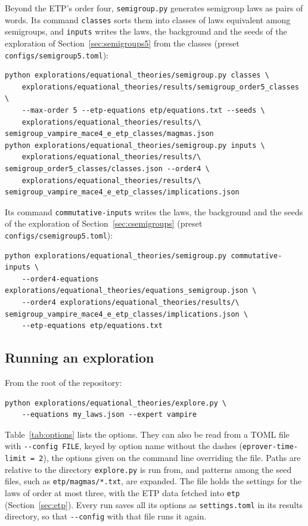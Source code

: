 \documentclass[11pt,a4paper]{article}
\theoremstyle{definition}
\theoremstyle{remark}
\newcommand{\code}[1]{\texttt{#1}}
\begin{document}
Beyond the ETP's order four, \code{semigroup.py} generates semigroup laws as pairs of words. Its command \code{classes} sorts them into classes of laws equivalent among semigroups, and \code{inputs} writes the laws, the background and the seeds of the exploration of Section~\ref{sec:semigroups5} from the classes (preset \code{configs/semigroup5.toml}):
\begin{Verbatim}
python explorations/equational_theories/semigroup.py classes \
    explorations/equational_theories/results/semigroup_order5_classes \
    --max-order 5 --etp-equations etp/equations.txt --seeds \
    explorations/equational_theories/results/\
semigroup_vampire_mace4_e_etp_classes/magmas.json
python explorations/equational_theories/semigroup.py inputs \
    explorations/equational_theories/results/\
semigroup_order5_classes/classes.json --order4 \
    explorations/equational_theories/results/\
semigroup_vampire_mace4_e_etp_classes/implications.json
\end{Verbatim}
Its command \code{commutative-inputs} writes the laws, the background and the seeds of the exploration of Section~\ref{sec:csemigroups} (preset \code{configs/csemigroup5.toml}):
\begin{Verbatim}
python explorations/equational_theories/semigroup.py commutative-inputs \
    --order4-equations explorations/equational_theories/equations_semigroup.json \
    --order4 explorations/equational_theories/results/\
semigroup_vampire_mace4_e_etp_classes/implications.json \
    --etp-equations etp/equations.txt
\end{Verbatim}

\subsection{Running an exploration}

From the root of the repository:
\begin{Verbatim}
python explorations/equational_theories/explore.py \
    --equations my_laws.json --expert vampire
\end{Verbatim}
Table~\ref{tab:options} lists the options. They can also be read from a TOML file with \code{-{}-config FILE}, keyed by option name without the dashes (\code{eprover-time-limit = 2}), the options given on the command line overriding the file. Paths are relative to the directory \code{explore.py} is run from, and patterns among the seed files, such as \code{etp/magmas/*.txt}, are expanded. The file  holds the settings for the laws of order at most three, with the ETP data fetched into \code{etp} (Section~\ref{sec:etp}). Every run saves all its options as \code{settings.toml} in its results directory, so that \code{-{}-config} with that file runs it again.
\end{document}
